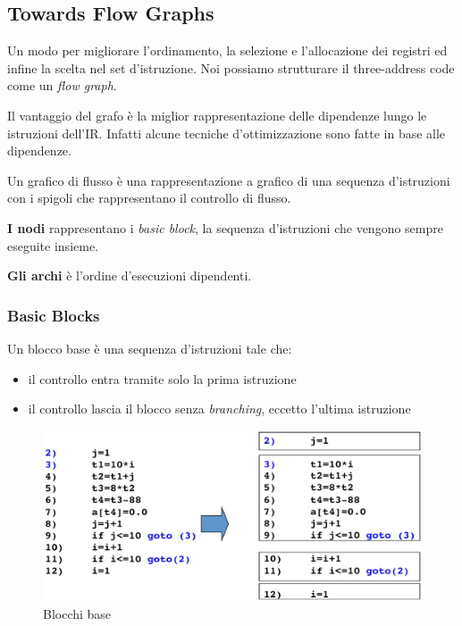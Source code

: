 \subsection{Towards Flow Graphs}
Un modo per migliorare l'ordinamento, la selezione e l'allocazione dei registri
ed infine la scelta nel set d'istruzione. Noi possiamo strutturare il
three-address code come un \textit{flow graph}.

Il vantaggio del grafo \`e la miglior rappresentazione delle dipendenze lungo
le istruzioni dell'IR. Infatti alcune tecniche d'ottimizzazione sono fatte in
base alle dipendenze.

\begin{definition}
Un grafico di flusso \`e una rappresentazione a grafico di una sequenza
d'istruzioni con i spigoli che rappresentano il controllo di flusso.
\end{definition}

\textbf{I nodi} rappresentano i \textit{basic block}, la sequenza d'istruzioni
che vengono sempre eseguite insieme.

\textbf{Gli archi} \`e l'ordine d'esecuzioni dipendenti.

\subsubsection{Basic Blocks}
\begin{definition}
Un blocco base \`e una sequenza d'istruzioni tale che:
\begin{itemize}
\item il controllo entra tramite solo la prima istruzione
\item il controllo lascia il blocco senza \textit{branching}, eccetto l'ultima
istruzione
\end{itemize}
\end{definition}

\begin{figure}[H]
  \centering
  \includegraphics[scale=0.5]{res/image/basic_block}
  \caption{Blocchi base}
  \label{img:basic_block}
\end{figure}

